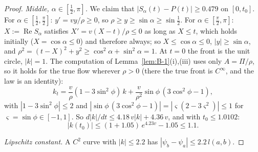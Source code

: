 \begin{proof}
\emph{Middle, $\alpha\in[\frac12,\pi]$.} We claim that $|S_\alpha(t)-P(t)|\ge0.479$ on $[0,t_0]$. For $\alpha\in[\frac12,\frac\pi2]$:
$y'=vy/\rho\ge0$, so $\rho\ge y\ge\sin\alpha\ge\sin\frac12$. For $\alpha\in[\frac\pi2,\pi]$: $X:=\operatorname{Re}S_\alpha$ satisfies
$X'=v(X-t)/\rho\le0$ as long as $X\le t$, which holds initially ($X=\cos\alpha\le0$) and therefore always; so
$X\le\cos\alpha\le0$, $|y|\ge\sin\alpha$, and $\rho^2=(t-X)^2+y^2\ge\cos^2\!\alpha+\sin^2\!\alpha=1$.
At $t=0$ the front is the unit circle, $|k|=1$. The computation of Lemma~\ref{lem:B-1}(i),(iii) uses only $A=\Pi/\rho$, so it holds
for the true flow wherever $\rho>0$ (there the true front is $C^\infty$, and the law is an identity):
\[
k_t=\frac v\rho(1-3\sin^2\!\phi)\,k+\frac v{\rho^2}\sin\phi\,(3\cos^2\!\phi-1),
\]
with $|1-3\sin^2\!\phi|\le2$ and $|\sin\phi\,(3\cos^2\!\phi-1)|=|\varsigma(2-3\varsigma^2)|\le1$ for
$\varsigma=\sin\phi\in[-1,1]$. So $d|k|/dt\le4.18\,v|k|+4.36\,v$, and with $t_0\le1.0102$:
\[
|k(t_0)|\le(1+1.05)\,e^{4.23v}-1.05\le1.1 .
\]

\emph{Lipschitz constant.} A $C^2$ curve with $|k|\le2.2$ has $|\psi_b-\psi_a|\le2.2\,l(a,b)$.
\end{proof}

